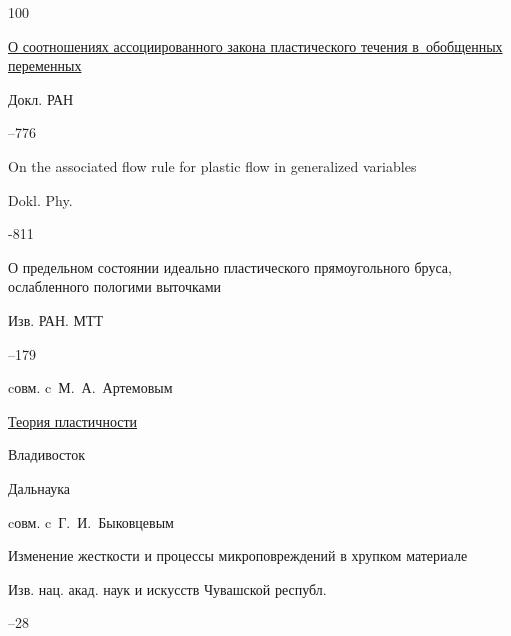 \begin{thebibliography}{100}

\paper \href{http://mi.mathnet.ru/dan19427}{О соотношениях ассоциированного закона пластического течения в~обобщенных переменных}

\jour Докл. РАН




--776


\transl

\paper On the associated flow rule for plastic flow in generalized variables

\jour Dokl. Phy. 




-811





\paper О предельном состоянии идеально пластического прямоугольного бруса, ослабленного пологими выточками 

\jour Изв. РАН. МТТ



–179 

\miscnote cовм. c~М.~А.~Артемовым




\book \href{www.worldcat.org/oclc/46352922}{Теория пластичности}

\publaddr Владивосток

\publ Дальнаука



\miscnote cовм. c~Г.~И.~Быковцевым




\paper Изменение жесткости и процессы микроповреждений в хрупком материале 

\jour Изв. нац. акад. наук и искусств Чувашской республ.



–28


\end{thebibliography}

